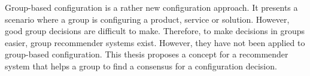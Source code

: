\Abstract

Group-based configuration is a rather new configuration approach. It presents a scenario where a group is configuring a product, service or solution. However, good group decisions are difficult to make. Therefore, to make decisions in groups easier, group recommender systems exist. However, they have not been applied to group-based configuration. This thesis proposes a concept for a recommender system that helps a group to find a consensus for a configuration decision.